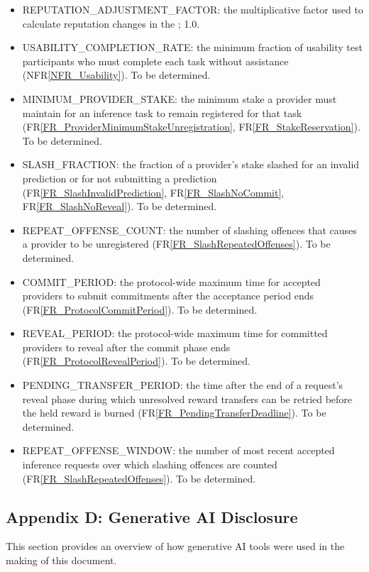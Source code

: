 \documentclass[12pt]{article}
\newcommand{\rref}[1]{FR\ref{#1}}
\newcommand{\nfrref}[1]{NFR\ref{#1}}
\begin{document}
\begin{itemize}
\item REPUTATION\_ADJUSTMENT\_FACTOR: the multiplicative factor used to calculate reputation changes in the ; 1.0.
\item USABILITY\_COMPLETION\_RATE: the minimum fraction of usability test participants who must complete each task without assistance (\nfrref{NFR_Usability}). To be determined.
\item MINIMUM\_PROVIDER\_STAKE: the minimum stake a provider must maintain for an inference task to remain registered for that task (\rref{FR_ProviderMinimumStakeUnregistration}, \rref{FR_StakeReservation}). To be determined.
\item SLASH\_FRACTION: the fraction of a provider's stake slashed for an invalid prediction or for not submitting a prediction (\rref{FR_SlashInvalidPrediction}, \rref{FR_SlashNoCommit}, \rref{FR_SlashNoReveal}). To be determined.
\item REPEAT\_OFFENSE\_COUNT: the number of slashing offences that causes a provider to be unregistered (\rref{FR_SlashRepeatedOffenses}). To be determined.
\item COMMIT\_PERIOD: the protocol-wide maximum time for accepted providers to submit commitments after the acceptance period ends (\rref{FR_ProtocolCommitPeriod}). To be determined.
\item REVEAL\_PERIOD: the protocol-wide maximum time for committed providers to reveal after the commit phase ends (\rref{FR_ProtocolRevealPeriod}). To be determined.
\item PENDING\_TRANSFER\_PERIOD: the time after the end of a request's reveal phase during which unresolved reward transfers can be retried before the held reward is burned (\rref{FR_PendingTransferDeadline}). To be determined.
\item REPEAT\_OFFENSE\_WINDOW: the number of most recent accepted inference requests over which slashing offences are counted (\rref{FR_SlashRepeatedOffenses}). To be determined.
\end{itemize}

\subsection{Appendix D: Generative AI Disclosure}

This section provides an overview of how generative AI tools were used in the
making of this document.
\end{document}
